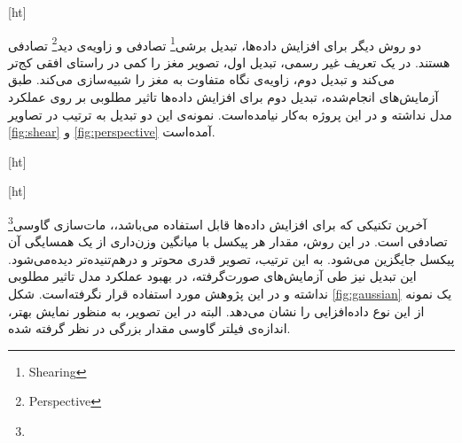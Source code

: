 [ht]

دو روش دیگر برای افزایش داده‌ها،
 تبدیل برشی\footnote{Shearing}
تصادفی و 
زاویه‌ی دید\footnote{Perspective}
تصادفی هستند.
در یک تعریف غیر رسمی، تبدیل اول، تصویر مغز را کمی در راستای افقی کج‌تر می‌کند و تبدیل دوم، زاویه‌ی نگاه متفاوت به مغز را شبیه‌سازی می‌کند.
طبق آزمایش‌های انجام‌شده، تبدیل دوم برای افزایش داده‌ها تاثیر مطلوبی بر روی عملکرد مدل نداشته و در این پروژه به‌کار نیامده‌است.
نمونه‌ی این دو تبدیل به ترتیب در تصاویر \ref{fig:shear} و \ref{fig:perspective} آمده‌است.


[ht]



[ht]

آخرین تکنیکی که برای افزایش داده‌ها قابل استفاده می‌باشد،، 
مات‌سازی گاوسی\footnote{}
تصادفی است.
در این روش، مقدار هر پیکسل با میانگین وزن‌داری از یک همسایگی آن پیکسل جایگزین می‌شود.
به این ترتیب، تصویر قدری محو‌تر و درهم‌تنیده‌تر دیده‌می‌شود.
این تبدیل نیز طی آزمایش‌های صورت‌گرفته، در بهبود عملکرد مدل تاثیر مطلوبی نداشته و در این پژوهش مورد استفاده قرار نگرفته‌است.
شکل \ref{fig:gaussian} یک نمونه از این نوع داده‌افزایی را نشان می‌دهد.
البته در این تصویر، به منظور نمایش بهتر، اندازه‌ی فیلتر گاوسی مقدار بزرگی در نظر گرفته شده.


